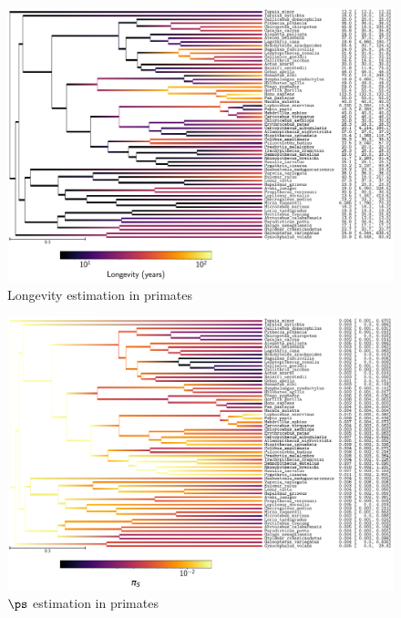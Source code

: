 \documentclass{article}
\begin{document}
	\begin{figure}[H]
		\centering
		\includegraphics[width=\linewidth, page=1]{primates/SiteMutSelBranchNe_Loglongevity}
		\caption[Longevity estimation in primates]{Longevity estimation in primates}
	\end{figure}

	\begin{figure}[H]
		\centering
		\includegraphics[width=\linewidth, page=1]{primates/SiteMutSelBranchNe_LogpiS}
		\caption[$\ps$ estimation in primates]{$\ps$ estimation in primates}
	\end{figure}
\end{document}
